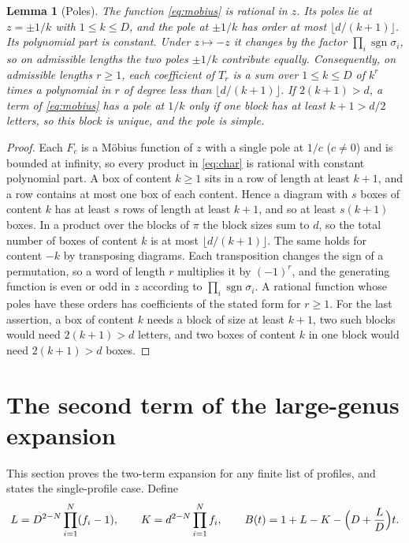 \documentclass[11pt,a4paper]{article}
\newtheorem{lemma}[theorem]{Lemma}
\theoremstyle{definition}\newtheorem{definition}[theorem]{Definition}
\theoremstyle{remark}\newtheorem{remark}[theorem]{Remark}\newtheorem{example}[theorem]{Example}
\DeclareMathOperator{\sgn}{sgn}
\numberwithin{equation}{section}
\begin{document}
\begin{lemma}[Poles]\label{lem:poles}
The function \eqref{eq:mobius} is rational in $z$. Its poles lie at $z=\pm1/k$ with $1\le k\le D$, and the pole at $\pm1/k$ has order at most $\lfloor d/(k+1)\rfloor$. Its polynomial part is constant. Under $z\mapsto-z$ it changes by the factor $\prod_i\sgn\sigma_i$, so on admissible lengths the two poles $\pm1/k$ contribute equally. Consequently, on admissible lengths $r\ge1$, each coefficient of $T_r$ is a sum over $1\le k\le D$ of $k^r$ times a polynomial in $r$ of degree less than $\lfloor d/(k+1)\rfloor$. If $2(k+1)>d$, a term of \eqref{eq:mobius} has a pole at $1/k$ only if one block has at least $k+1>d/2$ letters, so this block is unique, and the pole is simple.
\end{lemma}
\begin{proof}
Each $F_c$ is a Möbius function of $z$ with a single pole at $1/c$ ($c\ne0$) and is bounded at infinity, so every product in \eqref{eq:char} is rational with constant polynomial part. A box of content $k\ge1$ sits in a row of length at least $k+1$, and a row contains at most one box of each content. Hence a diagram with $s$ boxes of content $k$ has at least $s$ rows of length at least $k+1$, and so at least $s(k+1)$ boxes. In a product over the blocks of $\pi$ the block sizes sum to $d$, so the total number of boxes of content $k$ is at most $\lfloor d/(k+1)\rfloor$. The same holds for content $-k$ by transposing diagrams. Each transposition changes the sign of a permutation, so a word of length $r$ multiplies it by $(-1)^r$, and the generating function is even or odd in $z$ according to $\prod_i\sgn\sigma_i$. A rational function whose poles have these orders has coefficients of the stated form for $r\ge1$. For the last assertion, a box of content $k$ needs a block of size at least $k+1$, two such blocks would need $2(k+1)>d$ letters, and two boxes of content $k$ in one block would need $2(k+1)>d$ boxes.
\end{proof}

\section{The second term of the large-genus expansion}\label{sec:two}
This section proves the two-term expansion for any finite list of profiles, and states the single-profile case. Define
\begin{equation}\label{eq:LK}
 L=D^{2-N}\prod_{i=1}^N(f_i-1),\qquad K=d^{2-N}\prod_{i=1}^Nf_i,\qquad B(t)=1+L-K-\Bigl(D+\frac LD\Bigr)t .
\end{equation}
\end{document}
